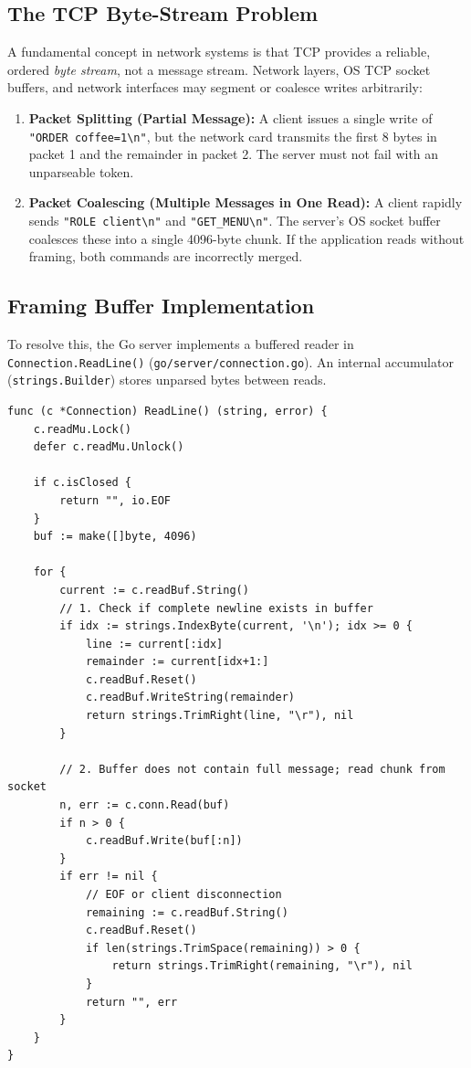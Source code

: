 \documentclass{labreport}
\begin{document}
\subsection{The TCP Byte-Stream Problem}
A fundamental concept in network systems is that TCP provides a reliable, ordered \textit{byte stream}, not a message stream. Network layers, OS TCP socket buffers, and network interfaces may segment or coalesce writes arbitrarily:
\begin{enumerate}
    \item \textbf{Packet Splitting (Partial Message):} A client issues a single write of \texttt{"ORDER coffee=1\textbackslash n"}, but the network card transmits the first 8 bytes in packet 1 and the remainder in packet 2. The server must not fail with an unparseable token.
    \item \textbf{Packet Coalescing (Multiple Messages in One Read):} A client rapidly sends \texttt{"ROLE client\textbackslash n"} and \texttt{"GET\_MENU\textbackslash n"}. The server's OS socket buffer coalesces these into a single 4096-byte chunk. If the application reads without framing, both commands are incorrectly merged.
\end{enumerate}

\subsection{Framing Buffer Implementation}
To resolve this, the Go server implements a buffered reader in \texttt{Connection.ReadLine()} (\texttt{go/server/connection.go}). An internal accumulator (\texttt{strings.Builder}) stores unparsed bytes between reads.

\begin{lstlisting}[style=golang, caption={Newline Delimiter Slicing in Connection.ReadLine()}]
func (c *Connection) ReadLine() (string, error) {
    c.readMu.Lock()
    defer c.readMu.Unlock()

    if c.isClosed {
        return "", io.EOF
    }
    buf := make([]byte, 4096)

    for {
        current := c.readBuf.String()
        // 1. Check if complete newline exists in buffer
        if idx := strings.IndexByte(current, '\n'); idx >= 0 {
            line := current[:idx]
            remainder := current[idx+1:]
            c.readBuf.Reset()
            c.readBuf.WriteString(remainder)
            return strings.TrimRight(line, "\r"), nil
        }

        // 2. Buffer does not contain full message; read chunk from socket
        n, err := c.conn.Read(buf)
        if n > 0 {
            c.readBuf.Write(buf[:n])
        }
        if err != nil {
            // EOF or client disconnection
            remaining := c.readBuf.String()
            c.readBuf.Reset()
            if len(strings.TrimSpace(remaining)) > 0 {
                return strings.TrimRight(remaining, "\r"), nil
            }
            return "", err
        }
    }
}
\end{lstlisting}
\end{document}

